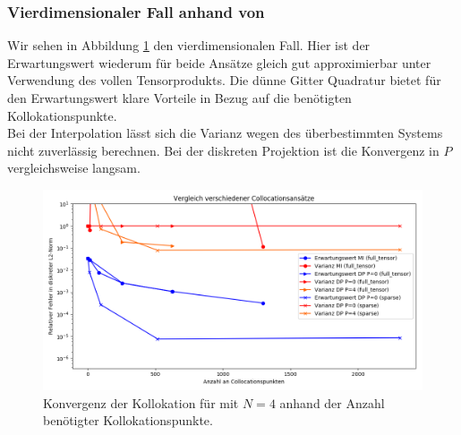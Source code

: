 \subsubsection*{Vierdimensionaler Fall anhand von }
Wir sehen in Abbildung \ref{fig:Kollokation_comparison_trial8} den vierdimensionalen Fall. Hier ist der Erwartungswert wiederum für beide Ansätze gleich gut approximierbar unter Verwendung des vollen Tensorprodukts. Die dünne Gitter Quadratur bietet für den Erwartungswert klare Vorteile in Bezug auf die benötigten Kollokationspunkte.\\
Bei der Interpolation lässt sich die Varianz wegen des überbestimmten Systems nicht zuverlässig berechnen. Bei der diskreten Projektion ist die Konvergenz in $P$ vergleichsweise langsam.
\begin{figure}[!htb]
\includegraphics[width=\textwidth]{Figures/collocation_midp_trial8.png}
\caption{Konvergenz der Kollokation für  mit $N=4$ anhand der Anzahl benötigter Kollokationspunkte.}
\label{fig:Kollokation_comparison_trial8}
\end{figure}

